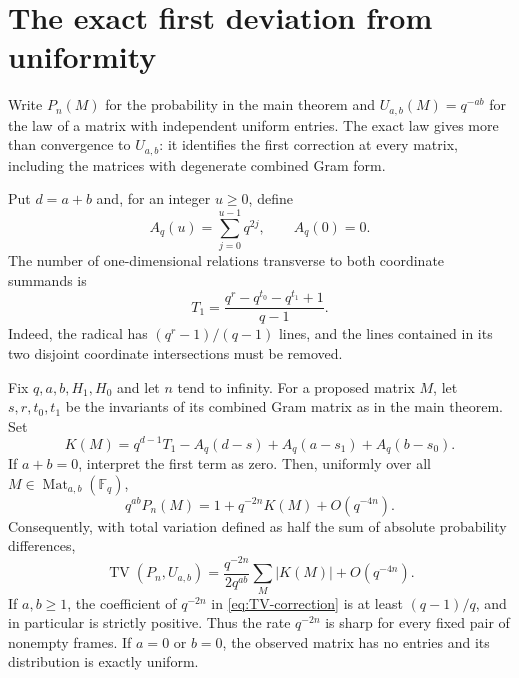 \section{The exact first deviation from uniformity}
\label{sec:asymptotics}

Write $P_n(M)$ for the probability in the main theorem and
$U_{a,b}(M)=q^{-ab}$ for the law of a matrix with independent uniform entries.
The exact law gives more than convergence to $U_{a,b}$: it identifies the
first correction at every matrix, including the matrices with degenerate
combined Gram form.

Put $d=a+b$ and, for an integer $u\geq 0$, define
\[
 A_q(u)=\sum_{j=0}^{u-1}q^{2j},\qquad A_q(0)=0.
\]
The number of one-dimensional relations transverse to both coordinate
summands is
\begin{equation}
 T_1=\frac{q^r-q^{t_0}-q^{t_1}+1}{q-1}.
 \label{eq:T-one}
\end{equation}
Indeed, the radical has $(q^r-1)/(q-1)$ lines, and the lines contained in
its two disjoint coordinate intersections must be removed.

\begin{theorem}
\label{thm:first-correction}
Fix $q,a,b,H_1,H_0$ and let $n$ tend to infinity. For a proposed matrix $M$,
let $s,r,t_0,t_1$ be the invariants of its combined Gram matrix as in the
main theorem. Set
\begin{equation}
 K(M)=q^{d-1}T_1-A_q(d-s)+A_q(a-s_1)+A_q(b-s_0).
 \label{eq:K-correction}
\end{equation}
If $a+b=0$, interpret the first term as zero. Then, uniformly over all
$M\in\operatorname{Mat}_{a,b}(\mathbb F_q)$,
\begin{equation}
 q^{ab}P_n(M)=1+q^{-2n}K(M)+O(q^{-4n}).
 \label{eq:likelihood-correction}
\end{equation}
Consequently, with total variation defined as half the sum of absolute
probability differences,
\begin{equation}
 \operatorname{TV}(P_n,U_{a,b})
 =\frac{q^{-2n}}{2q^{ab}}\sum_M |K(M)|+O(q^{-4n}).
 \label{eq:TV-correction}
\end{equation}
If $a,b\geq1$, the coefficient of $q^{-2n}$ in
\eqref{eq:TV-correction} is at least $(q-1)/q$, and in particular is
strictly positive. Thus the rate $q^{-2n}$ is sharp for every fixed pair
of nonempty frames. If $a=0$ or $b=0$, the observed matrix has no entries
and its distribution is exactly uniform.
\end{theorem}

